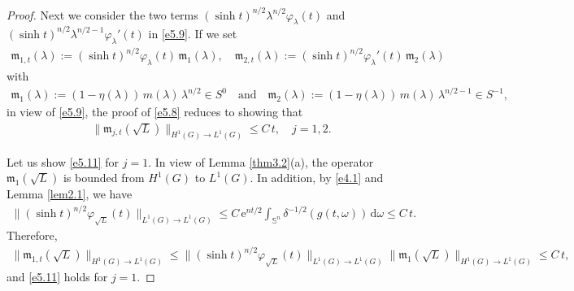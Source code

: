 \documentclass[a4paper,12pt]{amsart}
\numberwithin{equation}{section}
\theoremstyle{definition}
\theoremstyle{remark}
\numberwithin{theorem}{section}
\newcommand{\e}{\mathrm{e}}
\renewcommand{\SS}{\mathbb{S}}
\renewcommand{\d}{\mathrm{d}}
\begin{document}
\begin{proof}
Next we consider the two terms $(\sinh t)^{n/2}\lambda^{n/2}\varphi_\lambda(t) 
$ and $ (\sinh t)^{n/2}\lambda^{n/2-1}\varphi_\lambda'(t)$ in \eqref{e5.9}. 
If we set
\begin{align*}
\mathfrak{m}_{1,t}(\lambda):=(\sinh t)^{n/2}\varphi_\lambda(t)\, \mathfrak{m}_1(\lambda),\quad \mathfrak{m}_{2,t}(\lambda):=(\sinh t)^{n/2}\varphi_\lambda'(t)\, \mathfrak{m}_2(\lambda)
\end{align*}
with
\begin{align*}
\mathfrak{m}_1(\lambda):=(1-\eta(\lambda))\, m(\lambda)\,\lambda^{n/2}\in S^0\quad\mbox{and}\quad\mathfrak{m}_2(\lambda):=(1-\eta(\lambda))\, m(\lambda)\,\lambda^{n/2-1}\in S^{-1},
\end{align*}
in view of \eqref{e5.9}, the proof of \eqref{e5.8} reduces to showing that
\begin{align}\label{e5.11}
\|\mathfrak{m}_{j,t}(\sqrt{L})\|_{H^1(G)\to L^1(G)}\leq C\, t, \quad j=1,2.
\end{align}

Let us show \eqref{e5.11} for $j=1$. 
In view of Lemma \ref{thm3.2}(a), the operator $\mathfrak{m}_1(\sqrt{L})$ is bounded from $H^1(G)$ to $L^1(G)$. In addition, by \eqref{e4.1} and Lemma \ref{lem2.1}, we have
\begin{align*}
\|(\sinh t)^{n/2}\varphi_{\sqrt{L}}(t)\|_{L^1(G)\to L^1(G)}\leq C\,\e^{nt/2}\int_{\SS^n}\delta^{-1/2}(g(t,\omega))\,\d\omega\leq C\, t.
\end{align*}
Therefore,
\begin{align*}
\|\mathfrak{m}_{1,t}(\sqrt{L})\|_{H^1(G)\to L^1(G)}\leq \|(\sinh t)^{n/2}\varphi_{\sqrt{L}}(t)\|_{L^1(G)\to L^1(G)}\|\mathfrak{m}_1(\sqrt{L})\|_{H^1(G)\to L^1(G)}\leq C\, t,
\end{align*}
and \eqref{e5.11} holds for $j=1$.


\end{proof}
\end{document}
